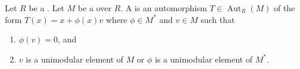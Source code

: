 \begin{definition} \label{definition:transvection_of_a_module_over_a_commutative_ring}
    Let $R$ be a . Let $M$ be a  over $R$.
    A  is an automorphism $T \in \operatorname{Aut}_R(M)$ of the form
    $T(x) = x + \phi(x)v$
    where $\phi \in M^*$  and $v \in M$ such that 
    \begin{enumerate}
        \item $\phi(v) = 0$, and
        \item $v$ is a unimodular element of $M$ or $\phi$ is a unimodular element of $M^*$.
    \end{enumerate}
\end{definition}